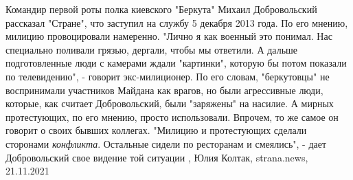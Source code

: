 Командир первой роты полка киевского "Беркута" Михаил Добровольский рассказал
"Стране", что заступил на службу 5 декабря 2013 года. По его мнению, милицию
провоцировали намеренно.  "Лично я как военный это понимал. Нас специально
поливали грязью, дергали, чтобы мы ответили. А дальше подготовленные люди с
камерами ждали "картинки", которую бы потом показали по телевидению", - говорит
экс-милиционер.  По его словам, "беркутовцы" не воспринимали участников Майдана
как врагов, но были агрессивные люди, которые, как считает Добровольский, были
"заряжены" на насилие. А мирных протестующих, по его мнению, просто
использовали.  Впрочем, то же самое он говорит о своих бывших коллегах.
"Милицию и протестующих сделали сторонами \emph{конфликта}. Остальные сидели по
ресторанам и смеялись", - дает Добровольский свое видение той ситуации
, 
Юлия Колтак, strana.news, 21.11.2021
